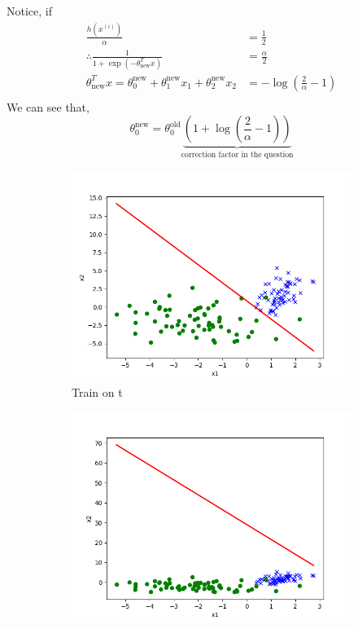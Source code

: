 \begin{answer}
Notice, if
$$
\begin{aligned}
\frac{h(x^{(i)})}{\alpha} &= \frac{1}{2}\\
\therefore \frac{1}{1+\exp(-\theta_\text{new}^Tx)} &= \frac{\alpha}{2}\\
\theta_\text{new}^Tx = \theta^{\text{new}}_0 + \theta^{\text{new}}_1x_1 + \theta^{\text{new}}_2x_2&= - \log(\frac{2}{\alpha}-1)\\
\end{aligned}
$$
We can see that,
$$
\theta^\text{new}_0 =\theta^\text{old}_0 \underbrace{ (1+\log(\frac{2}{\alpha}-1))}_\text{correction factor in the question}
$$
\begin{figure}[htbp]
    \begin{subfigure}[b]{0.3\linewidth}
        \centering
        \includegraphics[width=\linewidth]{pics/p02c.png}
        \caption{Train on t}
    \end{subfigure}
    \begin{subfigure}[b]{0.3\linewidth}
        \centering
        \includegraphics[width=\linewidth]{pics/p02d.png}

\end{subfigure}
\end{figure}
\end{answer}
